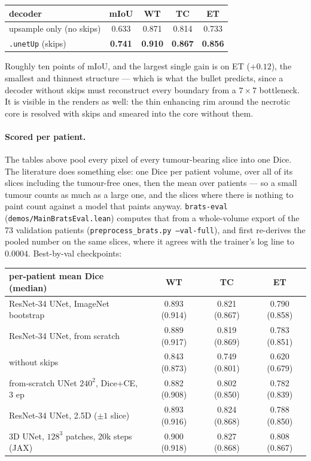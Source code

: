 \begin{center}
\begin{tabular}{lcccc}
\hline
decoder & mIoU & WT & TC & ET \\
\hline
upsample only (no skips) & 0.633 & 0.871 & 0.814 & 0.733 \\
\texttt{.unetUp} (skips)  & \textbf{0.741} & \textbf{0.910} & \textbf{0.867} & \textbf{0.856} \\
\hline
\end{tabular}
\end{center}

\noindent Roughly ten points of mIoU, and the largest single gain is on ET
($+0.12$), the smallest and thinnest structure --- which is what the bullet
predicts, since a decoder without skips must reconstruct every boundary from a
$7 \times 7$ bottleneck. It is visible in the renders as well: the thin
enhancing rim around the necrotic core is resolved with skips and smeared into
the core without them.

\paragraph{Scored per patient.} The tables above pool every pixel of every
tumour-bearing slice into one Dice. The literature does something else: one
Dice per patient volume, over all of its slices including the tumour-free
ones, then the mean over patients --- so a small tumour counts as much as a
large one, and the slices where there is nothing to paint count against a model
that paints anyway. \texttt{brats-eval} (\texttt{demos/MainBratsEval.lean})
computes that from a whole-volume export of the 73 validation patients
(\texttt{preprocess\_brats.py --val-full}), and first re-derives the pooled
number on the same slices, where it agrees with the trainer's log line to
$0.0004$. Best-by-val checkpoints:

\begin{center}
\begin{tabular}{lccc}
\hline
per-patient mean Dice (median) & WT & TC & ET \\
\hline
ResNet-34 UNet, ImageNet bootstrap & 0.893 (0.914) & 0.821 (0.867) & 0.790 (0.858) \\
ResNet-34 UNet, from scratch       & 0.889 (0.917) & 0.819 (0.869) & 0.783 (0.851) \\
\quad without skips               & 0.843 (0.873) & 0.749 (0.801) & 0.620 (0.679) \\
from-scratch UNet $240^2$, Dice+CE, 3 ep & 0.882 (0.908) & 0.802 (0.850) & 0.782 (0.839) \\
\hline
ResNet-34 UNet, 2.5D ($\pm 1$ slice) & 0.893 (0.916) & 0.824 (0.868) & 0.788 (0.850) \\
3D UNet, $128^3$ patches, 20k steps (JAX) & 0.900 (0.918) & 0.827 (0.868) & 0.808 (0.867) \\
\hline
\end{tabular}
\end{center}


